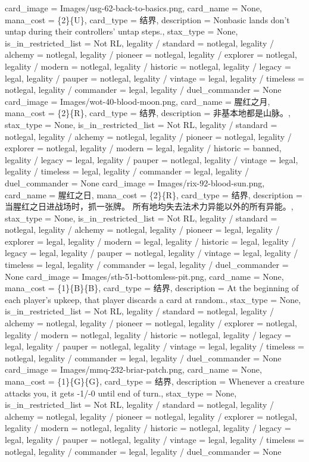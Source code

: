 \documentclass[lang = cn, color = black, 10pt]{AllThatStax}
\begin{document}
\card
{
	card_image = Images/usg-62-back-to-basics.png,
	card_name = None,
	mana_cost = \{2\}\{U\},
	card_type = 结界,
	description = Nonbasic lands don't untap during their controllers' untap steps.,
	stax_type = None,
	is_in_restricted_list = Not RL,
	legality / standard = notlegal,
	legality / alchemy = notlegal,
	legality / pioneer = notlegal,
	legality / explorer = notlegal,
	legality / modern = notlegal,
	legality / historic = notlegal,
	legality / legacy = legal,
	legality / pauper = notlegal,
	legality / vintage = legal,
	legality / timeless = notlegal,
	legality / commander = legal,
	legality / duel_commander = None
}
\card
{
	card_image = Images/wot-40-blood-moon.png,
	card_name = 腥红之月,
	mana_cost = \{2\}\{R\},
	card_type = 结界,
	description = 非基本地都是山脉。,
	stax_type = None,
	is_in_restricted_list = Not RL,
	legality / standard = notlegal,
	legality / alchemy = notlegal,
	legality / pioneer = notlegal,
	legality / explorer = notlegal,
	legality / modern = legal,
	legality / historic = banned,
	legality / legacy = legal,
	legality / pauper = notlegal,
	legality / vintage = legal,
	legality / timeless = legal,
	legality / commander = legal,
	legality / duel_commander = None
}
\card
{
	card_image = Images/rix-92-blood-sun.png,
	card_name = 腥红之日,
	mana_cost = \{2\}\{R\},
	card_type = 结界,
	description = 当腥红之日进战场时，抓一张牌。
	所有地均失去法术力异能以外的所有异能。,
	stax_type = None,
	is_in_restricted_list = Not RL,
	legality / standard = notlegal,
	legality / alchemy = notlegal,
	legality / pioneer = legal,
	legality / explorer = legal,
	legality / modern = legal,
	legality / historic = legal,
	legality / legacy = legal,
	legality / pauper = notlegal,
	legality / vintage = legal,
	legality / timeless = legal,
	legality / commander = legal,
	legality / duel_commander = None
}
\card
{
	card_image = Images/sth-51-bottomless-pit.png,
	card_name = None,
	mana_cost = \{1\}\{B\}\{B\},
	card_type = 结界,
	description = At the beginning of each player's upkeep, that player discards a card at random.,
	stax_type = None,
	is_in_restricted_list = Not RL,
	legality / standard = notlegal,
	legality / alchemy = notlegal,
	legality / pioneer = notlegal,
	legality / explorer = notlegal,
	legality / modern = notlegal,
	legality / historic = notlegal,
	legality / legacy = legal,
	legality / pauper = notlegal,
	legality / vintage = legal,
	legality / timeless = notlegal,
	legality / commander = legal,
	legality / duel_commander = None
}
\card
{
	card_image = Images/mmq-232-briar-patch.png,
	card_name = None,
	mana_cost = \{1\}\{G\}\{G\},
	card_type = 结界,
	description = Whenever a creature attacks you, it gets -1/-0 until end of turn.,
	stax_type = None,
	is_in_restricted_list = Not RL,
	legality / standard = notlegal,
	legality / alchemy = notlegal,
	legality / pioneer = notlegal,
	legality / explorer = notlegal,
	legality / modern = notlegal,
	legality / historic = notlegal,
	legality / legacy = legal,
	legality / pauper = notlegal,
	legality / vintage = legal,
	legality / timeless = notlegal,
	legality / commander = legal,
	legality / duel_commander = None
}
\end{document}
